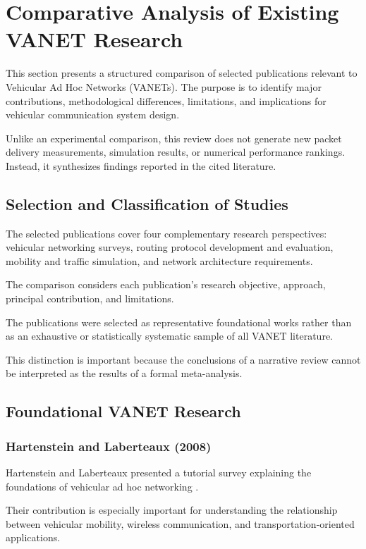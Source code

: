
\section{Comparative Analysis of Existing VANET Research}
\label{sec:comparative}

This section presents a structured comparison of
selected publications relevant to Vehicular Ad Hoc
Networks (VANETs). The purpose is to identify
major contributions, methodological differences,
limitations, and implications for vehicular
communication system design.

Unlike an experimental comparison, this review
does not generate new packet delivery measurements,
simulation results, or numerical performance
rankings. Instead, it synthesizes findings
reported in the cited literature.

\subsection{Selection and Classification of Studies}

The selected publications cover four complementary
research perspectives: vehicular networking
surveys, routing protocol development and
evaluation, mobility and traffic simulation,
and network architecture requirements.

The comparison considers each publication's
research objective, approach, principal
contribution, and limitations.

The publications were selected as representative
foundational works rather than as an exhaustive
or statistically systematic sample of all
VANET literature.

This distinction is important because the
conclusions of a narrative review cannot
be interpreted as the results of a formal
meta-analysis.

\subsection{Foundational VANET Research}

\subsubsection{Hartenstein and Laberteaux (2008)}

Hartenstein and Laberteaux presented a tutorial
survey explaining the foundations of vehicular
ad hoc networking \cite{Hartenstein2008}.

Their contribution is especially important
for understanding the relationship between
vehicular mobility, wireless communication,
and transportation-oriented applications.

